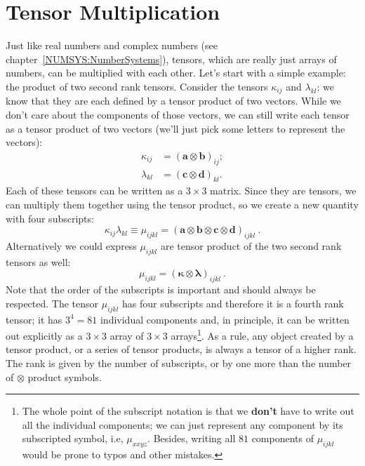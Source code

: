 \section{Tensor Multiplication}
Just like real numbers and complex numbers (see chapter~\ref{NUMSYS:NumberSystems}), tensors, which are really just arrays of numbers, can be multiplied with each other.  Let's start with a simple example: the product of two second rank tensors. Consider the tensors $\kappa_{ij}$ and $\lambda_{kl}$; we know that they are each defined by a tensor product of two vectors.  While we don't care about the components of those vectors, we can still write each tensor as a tensor product of two vectors (we'll just pick some letters to represent the vectors):
\begin{equation}
	\begin{split}
		\kappa_{ij} & = (\mathbf{a}\otimes\mathbf{b})_{ij};\\
		\lambda_{kl} & = (\mathbf{c}\otimes\mathbf{d})_{kl}.
	\end{split}
\end{equation}
Each of these tensors can be written as a $3\times 3$ matrix.  Since they are tensors, we can multiply them together using the tensor product, so we create a new quantity with four subscripts:
\begin{equation}
	\kappa_{ij}\lambda_{kl} \equiv \mu_{ijkl} =  (\mathbf{a}\otimes\mathbf{b}\otimes\mathbf{c}\otimes\mathbf{d})_{ijkl}\ .
\end{equation}
Alternatively we could express $\mu_{ijkl}$ are tensor product of the two second rank tensors as well:
\begin{equation}
	\mu_{ijkl} =  (\bm{\kappa}\otimes\bm{\lambda})_{ijkl}\ .
\end{equation}
Note that the order of the subscripts is important and should always be respected. The tensor $\mu_{ijkl}$ has four subscripts and therefore it is a fourth rank tensor; it has $3^4=81$ individual components and, in principle, it can be written out explicitly as a $3\times 3$ array of $3\times 3$ arrays\footnote{The whole point of the subscript notation is that we \textbf{don't} have to write out all the individual components; we can just represent any component by its subscripted symbol, i.e, $\mu_{xxyz}$. Besides, writing all $81$ components of $\mu_{ijkl}$ would be prone to typos and other mistakes.}.  As a rule, any object created by a tensor product, or a series of tensor products, is always a tensor of a higher rank.  The rank is given by the number of subscripts, or by one more than the number of $\otimes$ product symbols.

